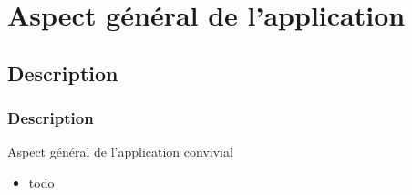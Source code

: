 \documentclass{beamer}
\begin{document}
\section{Aspect général de l'application}
  \subsection{Description}
  \begin{frame}
   \frametitle{Description}
  Aspect général de l'application convivial
   \begin{itemize}
   \item todo
   \end{itemize}
  \end{frame}



\end{document}
